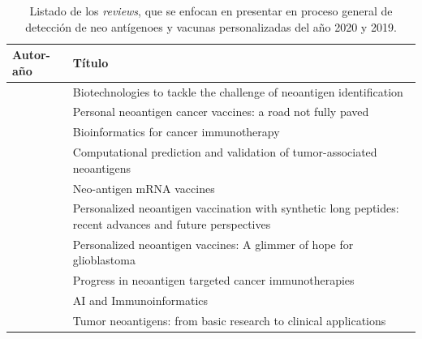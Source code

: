 \begin{table}[H]
	\caption{Listado de los \textit{reviews}, que se enfocan en presentar en proceso general de detección de neo antígenoes y vacunas personalizadas del año 2020 y 2019.}
	\label{tab:review_2020_2019}
	\begin{tabular}{p{3cm}p{10cm}}
		\textbf{Autor-año }                            & \textbf{Título}                                                                                                                             \\ \hline	
		\cite{arnaud2020biotechnologies}      & Biotechnologies to tackle the challenge of neoantigen identification                                                                      \\
		\cite{fritsch2020personal}            & Personal neoantigen cancer vaccines: a road not fully paved                                                                               \\
		\cite{holtstrater2020bioinformatics}  & Bioinformatics for cancer immunotherapy                                                                                                   \\
		\cite{roudko2020computational}        & Computational prediction and validation of tumor-associated neoantigens                                                                   \\
		\cite{esprit2020neo}                  & Neo-antigen mRNA vaccines                                                                                                                 \\
		\cite{chen2020personalized}           & Personalized neoantigen vaccination with synthetic long peptides: recent advances and future perspectives                                 \\
		\cite{londhe2020personalized}         & Personalized neoantigen vaccines: A glimmer of hope for glioblastoma                                                                      \\
		\cite{han2020progress}                & Progress in neoantigen targeted cancer immunotherapies                                                                                    \\
		\cite{keshavarzi2020ai}               & AI and Immunoinformatics                                                                                                                  \\
		\cite{jiang2019tumor}                 & Tumor neoantigens: from basic research to clinical applications                                                                           \\

\end{tabular}
\end{table}
